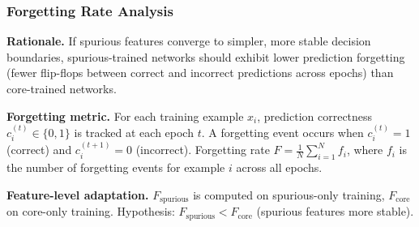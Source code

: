 \subsubsection{Forgetting Rate Analysis}

\textbf{Rationale.} If spurious features converge to simpler, more stable decision boundaries, spurious-trained networks should exhibit lower prediction forgetting (fewer flip-flops between correct and incorrect predictions across epochs) than core-trained networks.

\textbf{Forgetting metric.} For each training example $x_i$, prediction correctness $c_i^{(t)} \in \{0, 1\}$ is tracked at each epoch $t$. A forgetting event occurs when $c_i^{(t)} = 1$ (correct) and $c_i^{(t+1)} = 0$ (incorrect). Forgetting rate $F = \frac{1}{N} \sum_{i=1}^N f_i$, where $f_i$ is the number of forgetting events for example $i$ across all epochs.

\textbf{Feature-level adaptation.} $F_{\text{spurious}}$ is computed on spurious-only training, $F_{\text{core}}$ on core-only training. Hypothesis: $F_{\text{spurious}} < F_{\text{core}}$ (spurious features more stable).
